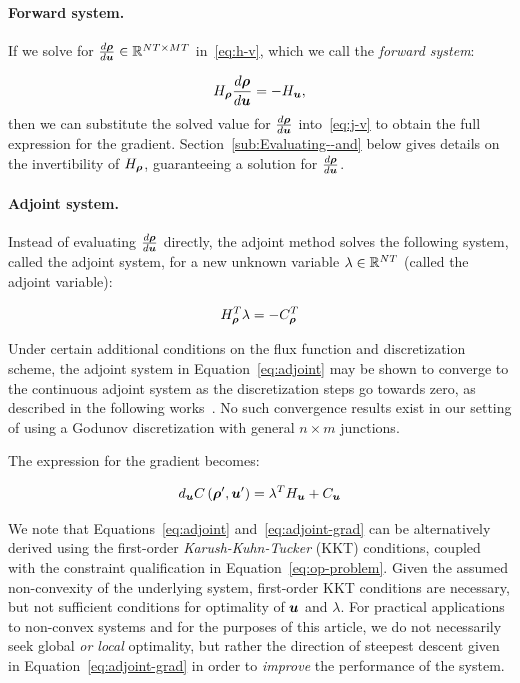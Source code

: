 \paragraph{Forward system.\label{par:Forward-system}}

If we solve for $\Dfrac{\state}{\control}\in\mathbb{R}^{\nlinks\ntime\times\ncontrols\ntime}$
in~\eqref{eq:h-v}, which we call the \emph{forward system}:

\[
\Hx\Dfrac{\state}{\control}=-\Hu,
\]
then we can substitute the solved value for $\Dfrac{\state}{\control}$
into~\eqref{eq:j-v} to obtain the full expression for the gradient.
Section~\ref{sub:Evaluating--and} below gives details on the invertibility
of $\Hx$, guaranteeing a solution for $\Dfrac{\state}{\control}$.


\paragraph{Adjoint system.\label{par:Adjoint-system}}

Instead of evaluating $\Dfrac{\state}{\control}$ directly, the adjoint
method solves the following system, called the adjoint system,
for a new unknown variable $\lambda\in\mathbb{R}^{NT}$
(called the adjoint variable):

\begin{equation}
\Hx^{T}\lambda=-\Jx^{T}\label{eq:adjoint}
\end{equation}

Under certain additional conditions on the flux function and discretization scheme, the adjoint system in Equation~\eqref{eq:adjoint} may be shown to converge to the continuous adjoint system as the discretization steps go towards zero, as described in the following works~\cite{Ulbrich2003AdjointBased,Banda2012Adjoint,Gugat2005}. No such convergence results exist in our setting of using a Godunov discretization with general $n\times m$ junctions.

The expression for the gradient becomes:

\begin{equation}
d_{\control}\cost\left(\nominal{\state},\nominal{\control}\right)=\lambda^{T}\Hu+\Ju\label{eq:adjoint-grad}
\end{equation}

We note that Equations~\eqref{eq:adjoint} and~\eqref{eq:adjoint-grad} can be alternatively derived using the first-order \emph{Karush-Kuhn-Tucker} (KKT) conditions, coupled with the constraint qualification in Equation~\eqref{eq:op-problem}. Given the assumed non-convexity of the underlying system, first-order KKT conditions are necessary, but not sufficient conditions for optimality of $\mathbf{\control}$ and $\lambda$. For practical applications to non-convex systems and for the purposes of this article, we do not necessarily seek global \emph{or local} optimality, but rather the direction of steepest descent given in Equation~\eqref{eq:adjoint-grad} in order to \emph{improve} the performance of the system.

